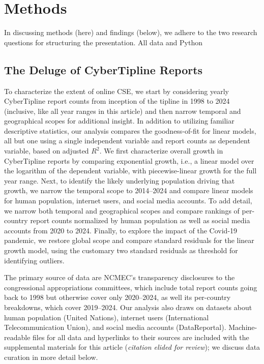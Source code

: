 \documentclass[anonymous,nonacm,screen,12pt]{acmart}
\newcommand\V[1]{{#1}}
\newcommand\V[1]{\textsc{\MakeLowercase{#1}}}
\theoremstyle{definition}
\begin{document}
\section{Methods}
\label{sec:methods}

In discussing methods (here) and findings (below), we adhere to the two research
questions for structuring the presentation. All data and Python


\subsection{The Deluge of CyberTipline Reports}

To characterize the extent of online \V{CSE}, we start by considering yearly
CyberTipline report counts from inception of the tipline in 1998 to 2024
(inclusive, like all year ranges in this article) and then narrow temporal and
geographical scopes for additional insight. In addition to utilizing familiar
descriptive statistics, our analysis compares the goodness-of-fit for linear
models, all but one using a single independent variable and report counts as
dependent variable, based on adjusted $R^2$. We first characterize overall
growth in CyberTipline reports by comparing exponential growth, i.e., a linear
model over the logarithm of the dependent variable, with piecewise-linear growth
for the full year range. Next, to identify the likely underlying population
driving that growth, we narrow the temporal scope to 2014--2024 and compare
linear models for human population, internet users, and social media accounts.
To add detail, we narrow both temporal and geographical scopes and compare
rankings of per-country report counts normalized by human population as well as
social media accounts from 2020 to 2024. Finally, to explore the impact of the
Covid-19 pandemic, we restore global scope and compare standard residuals for
the linear growth model, using the customary two standard residuals as threshold
for identifying outliers.

The primary source of data are \V{NCMEC}'s transparency disclosures to the
congressional appropriations committees, which include total report counts going
back to 1998 but otherwise cover only 2020--2024, as well its per-country
breakdowns, which cover 2019--2024. Our analysis also draws on datasets about
human population (United Nations), internet users (International
Telecommunication Union), and social media accounts (DataReportal).
Machine-readable files for all data and hyperlinks to their sources are included
with the supplemental materials for this article (\emph{citation elided for
review}); we discuss data curation in more detail below.
\end{document}
